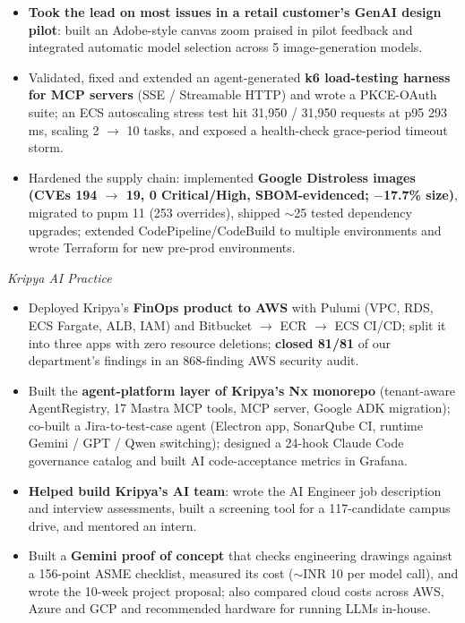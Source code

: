 \documentclass[11pt,a4paper,sans]{moderncv}
\begin{document}
{{\begin{itemize}[leftmargin=0.6cm, label={\textbullet}, itemsep=1pt, topsep=2pt]
\item \textbf{Took the lead on most issues in a retail customer's GenAI design pilot}: built an Adobe-style canvas zoom praised in pilot feedback and integrated automatic model selection across 5 image-generation models.
\item Validated, fixed and extended an agent-generated \textbf{k6 load-testing harness for MCP servers} (SSE / Streamable HTTP) and wrote a PKCE-OAuth suite; an ECS autoscaling stress test hit 31,950 / 31,950 requests at p95 293\,ms, scaling 2 $\rightarrow$ 10 tasks, and exposed a health-check grace-period timeout storm.
\item Hardened the supply chain: implemented \textbf{Google Distroless images (CVEs 194 $\rightarrow$ 19, 0 Critical/High, SBOM-evidenced; $-$17.7\% size)}, migrated to pnpm 11 (253 overrides), shipped $\sim$25 tested dependency upgrades; extended CodePipeline/CodeBuild to multiple environments and wrote Terraform for new pre-prod environments.
\end{itemize}
\textit{Kripya AI Practice}
\begin{itemize}[leftmargin=0.6cm, label={\textbullet}, itemsep=1pt, topsep=2pt]
\item Deployed Kripya's \textbf{FinOps product to AWS} with Pulumi (VPC, RDS, ECS Fargate, ALB, IAM) and Bitbucket $\rightarrow$ ECR $\rightarrow$ ECS CI/CD; split it into three apps with zero resource deletions; \textbf{closed 81/81} of our department's findings in an 868-finding AWS security audit.
\item Built the \textbf{agent-platform layer of Kripya's Nx monorepo} (tenant-aware AgentRegistry, 17 Mastra MCP tools, MCP server, Google ADK migration); co-built a Jira-to-test-case agent (Electron app, SonarQube CI, runtime Gemini / GPT / Qwen switching); designed a 24-hook Claude Code governance catalog and built AI code-acceptance metrics in Grafana.
\item \textbf{Helped build Kripya's AI team}: wrote the AI Engineer job description and interview assessments, built a screening tool for a 117-candidate campus drive, and mentored an intern.
\item Built a \textbf{Gemini proof of concept} that checks engineering drawings against a 156-point ASME checklist, measured its cost ($\sim$INR 10 per model call), and wrote the 10-week project proposal; also compared cloud costs across AWS, Azure and GCP and recommended hardware for running LLMs in-house.
\end{itemize}}}
\end{document}
